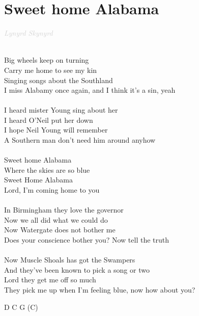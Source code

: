 \documentclass[a5paper, 10pt]{book}
\begin{document}
\section{Sweet home Alabama}\textcolor{lightgray}{\textit{Lynyrd Skynyrd}}\\~\\
\begin{minipage}[t]{0.8\textwidth}
Big wheels keep on turning\\
Carry me home to see my kin\\
Singing songs about the Southland\\
I miss Alabamy once again, and I think it’s a sin, yeah\\
\\
I heard mister Young sing about her\\
I heard O’Neil put her down\\
I hope Neil Young will remember\\
A Southern man don't need him around anyhow\\
\\
Sweet home Alabama\\
Where the skies are so blue\\
Sweet Home Alabama\\
Lord, I'm coming home to you\\
\\
In Birmingham they love the governor\\
Now we all did what we could do\\
Now Watergate does not bother me\\
Does your conscience bother you? Now tell the truth\\
\\
Now Muscle Shoals has got the Swampers\\
And they've been known to pick a song or two\\
Lord they get me off so much\\
They pick me up when I'm feeling blue, now how about you?\\
\end{minipage}
\begin{minipage}[t]{0.2\textwidth}
D C G (C)\\
\end{minipage}

\newpage
\end{document}
